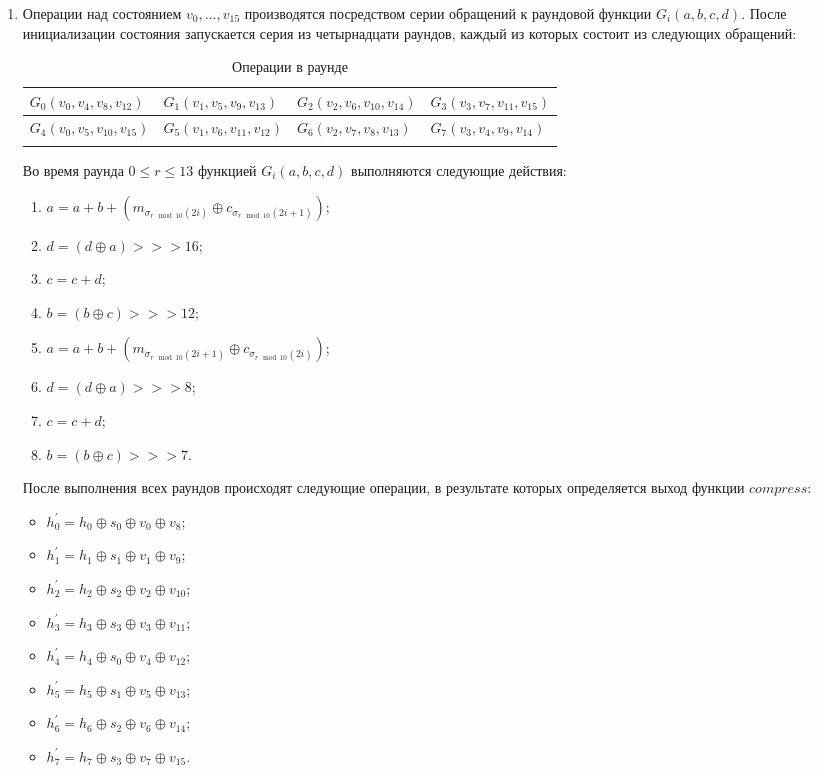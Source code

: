 \documentclass{./civarticle}
\begin{document}
\begin{enumerate}
\item Операции над состоянием $v_0, ..., v_{15}$ производятся посредством серии обращений к раундовой функции $G_i(a, b, c, d)$. После инициализации состояния запускается серия из четырнадцати раундов, каждый из которых состоит из следующих обращений:

\begin{longtable}{|p{2.6cm}|p{2.6cm}|p{2.6cm}|p{2.6cm}|}
\hline
$G_0(v_0, v_4, v_8, v_{12})$ & $G_1(v_1, v_5, v_9, v_{13})$ & $G_2(v_2, v_6, v_{10}, v_{14})$ & $G_3(v_3, v_7, v_{11}, v_{15})$ \\
\hline
$G_4(v_0, v_5, v_{10}, v_{15})$ & $G_5(v_1, v_6, v_{11}, v_{12})$ & $G_6(v_2, v_7, v_8, v_{13})$ & $G_7(v_3, v_4, v_9, v_{14})$ \\
\hline
\caption{Операции в раунде}
\end{longtable}

Во время раунда $0 \leq r \leq 13$ функцией $G_i(a, b, c, d)$ выполняются следующие действия:

\begin{enumerate}
    \item $a = a + b + (m_{\sigma_{r \mod 10}(2i)} \oplus c_{\sigma_{r \mod 10}(2i+1)})$;
    \item $d = (d \oplus a) >>> 16$;
    \item $c = c + d$;
    \item $b = (b \oplus c) >>> 12$;
    \item $a = a + b + (m_{\sigma_{r \mod 10}(2i+1)} \oplus c_{\sigma_{r \mod 10}(2i)})$;
    \item $d = (d \oplus a) >>> 8$;
    \item $c = c + d$;
    \item $b = (b \oplus c) >>> 7$.
\end{enumerate}

После выполнения всех раундов происходят следующие операции, в результате которых определяется выход функции $compress$:

\begin{itemize}
    \item $h_0^{'} = h_0 \oplus s_0 \oplus v_0 \oplus v_8$;
    \item $h_1^{'} = h_1 \oplus s_1 \oplus v_1 \oplus v_9$;
    \item $h_2^{'} = h_2 \oplus s_2 \oplus v_2 \oplus v_{10}$;
    \item $h_3^{'} = h_3 \oplus s_3 \oplus v_3 \oplus v_{11}$;
    \item $h_4^{'} = h_4 \oplus s_0 \oplus v_4 \oplus v_{12}$;
    \item $h_5^{'} = h_5 \oplus s_1 \oplus v_5 \oplus v_{13}$;
    \item $h_6^{'} = h_6 \oplus s_2 \oplus v_6 \oplus v_{14}$;
    \item $h_7^{'} = h_7 \oplus s_3 \oplus v_7 \oplus v_{15}$.
\end{itemize}


\end{enumerate}
\end{document}
